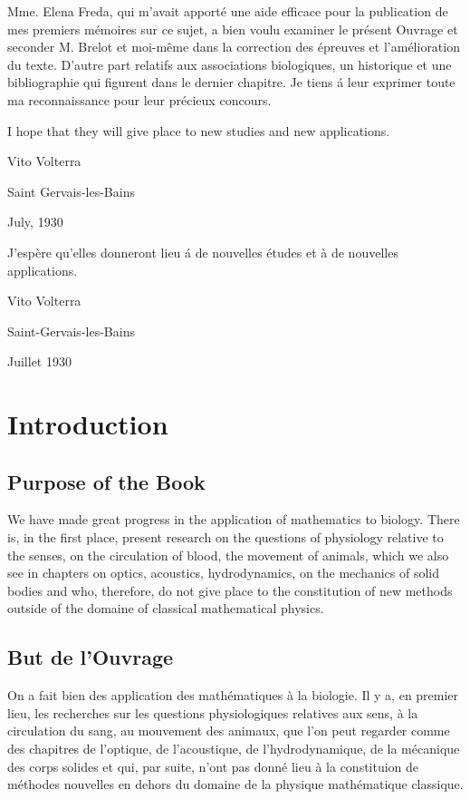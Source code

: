 \documentclass[crop=false,class=book,oneside]{standalone}
\begin{document}
\begin{paracol}{2}
\switchcolumn
\foreignlanguage{french}{
Mme. Elena Freda, qui m'avait apport\'{e} une aide efficace pour la publication de mes premiers m\'{e}moires sur ce sujet, a bien voulu examiner le pr\'{e}sent Ouvrage et seconder M. Brelot et moi-m\^{e}me dans la correction des \'{e}preuves et l'am\'{e}lioration du texte. D'autre part relatifs aux associations biologiques, un historique et une bibliographie qui figurent dans le dernier chapitre. Je tiens \'{a} leur exprimer toute ma reconnaissance pour leur pr\'{e}cieux concours.}
\par\hfill\par
\switchcolumn
I hope that they will give place to new studies and new applications.\par\hfill\par
Vito Volterra\hfill\par
Saint Gervais-les-Bains\hfill\par
July, 1930\par
\switchcolumn
\begin{sloppypar}
J'esp\`{e}re qu'elles donneront lieu \'{a} de nouvelles \'{e}tudes et \`{a} de nouvelles applications.\par\hfill\par
Vito Volterra\hfill\par
Saint-Gervais-les-Bains\hfill\par
Juillet 1930
\end{sloppypar}
\end{paracol}
\chapter{Introduction}
\begin{paracol}{2}
\section{Purpose of the Book}
We have made great progress in the application of mathematics to biology. There is, in the first place, present research on the questions of physiology relative to the senses, on the circulation of blood, the movement of animals, which we also see in chapters on optics, acoustics, hydrodynamics, on the mechanics of solid bodies and who, therefore, do not give place to the constitution of new methods outside of the domaine of classical mathematical physics.
\switchcolumn
\section*{But de l'Ouvrage}
\begin{sloppypar}
On a fait bien des application des math\'{e}matiques \`{a} la biologie. Il y a, en premier lieu, les recherches sur les questions physiologiques relatives aux sens, \`{a} la circulation du sang, au mouvement des animaux, que l'on peut regarder comme des chapitres de l'optique, de l'acoustique, de l'hydrodynamique, de la m\'{e}canique des corps solides et qui, par suite, n'ont pas donn\'{e} lieu \`{a} la constituion de m\'{e}thodes nouvelles en dehors du domaine de la physique math\'{e}matique classique.
\end{sloppypar}
\end{paracol}
\end{document}
